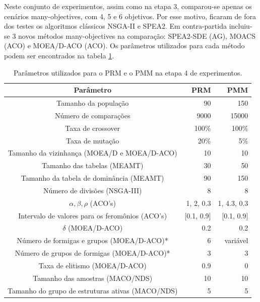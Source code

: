 Neste conjunto de experimentos, assim como na etapa 3, comparou-se apenas os cenários many-objectives, com 4, 5 e 6 objetivos. Por esse motivo, ficaram de fora dos testes os algoritmos clássicos NSGA-II e SPEA2. Em contra-partida incluiu-se 3 novos métodos many-objectives na comparação: SPEA2-SDE (AG), MOACS (ACO) e MOEA/D-ACO (ACO). Os parâmetros utilizados para cada método podem ser encontrados na tabela \ref{table_exp4_params}.

\begin{table}[!htbp]
	\caption{Parâmetros utilizados para o PRM e o PMM na etapa 4 de experimentos.}
	\label{table_exp4_params}
	\begin{center}
		\begin{tabular}{c|r|r}
			\textbf{Parâmetro} & \textbf{PRM} &  \textbf{PMM} \\ %
			\hline
			Tamanho da população               &    90 &      150 \\ %
			Número de comparações        &   9000 &      15000 \\ %
			Taxa de crossover                & 100\% &    100\% \\ %
			Taxa de mutação                 &  20\% &      5\% \\ %
			Tamanho da vizinhança (MOEA/D e MOEA/D-ACO)    &    10 &       10 \\ %
			Tamanho das tabelas (MEAMT)   &    30 &       50 \\ %
			Tamanho da tabela de dominância (MEAMT) &    90 &      150 \\ %
			Número de divisões (NSGA-III)&     8 &        8 \\ %
			$\alpha, \beta, \rho$ (ACO's)& 1, 2, 0.3 & 1, 4.3, 0.3 \\ %
			Intervalo de valores para os feromônios (ACO's)& [0.1, 0.9] & [0.1, 0.9] \\ %
			$\delta$ (MOEA/D-ACO)& 0.2 & 0.2 \\ %
			Número de formigas e grupos (MOEA/D-ACO)*& 6 & variável \\ %
			Número de grupos de formigas (MOEA/D-ACO)*& 3 & 3 \\ %
			Taxa de elitismo (MOEA/D-ACO)& 0.9 & 0 \\ %
			Tamanho das amostras (MACO/NDS)& 10 & 10 \\  %
			Tamanho do grupo de estruturas ativas (MACO/NDS)& 5 & 5 \\
			\hline
		\end{tabular}
	\end{center}
\end{table}

